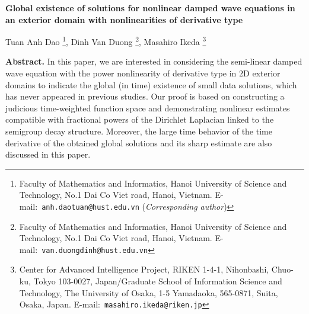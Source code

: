 \documentclass[a4paper,11pt]{article} %
\theoremstyle{remark}
\theoremstyle{definition}
\numberwithin{equation}{section}
\begin{document}
\begin{center}
\Large{{\bf
Global existence of solutions for nonlinear damped wave equations in an exterior domain with nonlinearities of derivative type}}
\end{center}

\vspace{5pt}

\begin{center}
Tuan Anh Dao
\footnote{
Faculty of Mathematics and Informatics, Hanoi University of Science and Technology, No.1 Dai Co Viet road, Hanoi, Vietnam.
E-mail:\ {\tt anh.daotuan@hust.edu.vn} (\textit{Corresponding author})},
Dinh Van Duong
\footnote{
Faculty of Mathematics and Informatics, Hanoi University of Science and Technology, No.1 Dai Co Viet road, Hanoi, Vietnam.
E-mail:\ {\tt van.duongdinh@hust.edu.vn}},
Masahiro Ikeda
\footnote{
Center for Advanced Intelligence Project, RIKEN 1-4-1, Nihonbashi, Chuo-ku, Tokyo 103-0027, Japan/Graduate School of Information Science and Technology, The University of Osaka, 1-5 Yamadaoka, 565-0871, Suita, Osaka, Japan.
E-mail:\ {\tt masahiro.ikeda@riken.jp}}\ 

\end{center}

\newenvironment{summary}{\vspace{.5\baselineskip}\begin{list}{}{%
     \setlength{\baselineskip}{0.85\baselineskip}
     \setlength{\topsep}{0pt}
     \setlength{\leftmargin}{12mm}
     \setlength{\rightmargin}{12mm}
     \setlength{\listparindent}{0mm}
     \setlength{\itemindent}{\listparindent}
     \setlength{\parsep}{0pt}
     \item\relax}}{\end{list}\vspace{.5\baselineskip}}

\begin{summary}
{\footnotesize {\bf Abstract.}
In this paper, we are interested in considering the semi-linear damped wave equation with the power nonlinearity of derivative type in $2$D exterior domains to indicate the global (in time) existence of small data solutions, which has never appeared in previous studies. Our proof is based on constructing a judicious time-weighted function space and demonstrating nonlinear estimates compatible with fractional powers of the Dirichlet Laplacian linked to the semigroup decay structure. Moreover, the large time behavior of the time derivative of the obtained global solutions and its sharp estimate are also discussed in this paper.}
\end{summary}
\end{document}
